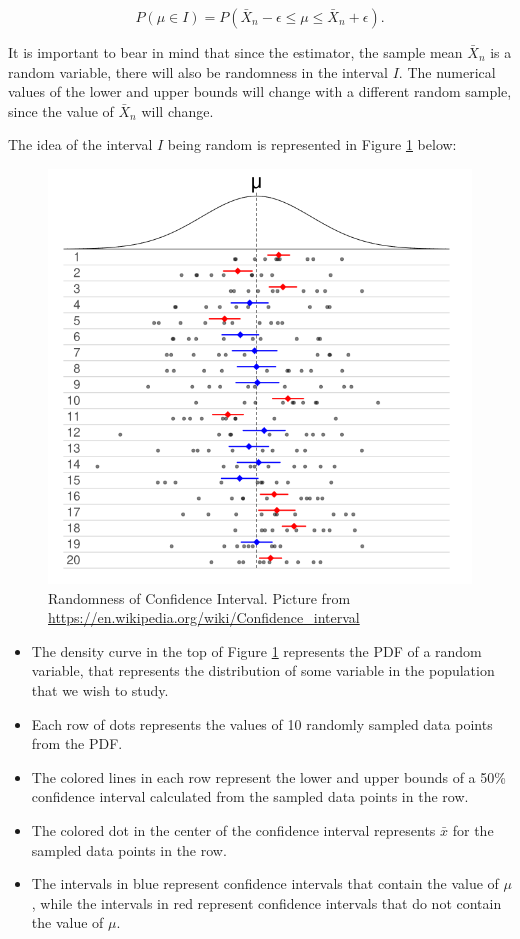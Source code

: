 \documentclass[
]{book}
\providecommand{\tightlist}{%
  \setlength{\itemsep}{0pt}\setlength{\parskip}{0pt}}
\begin{document}
\begin{equation} 
P(\mu \in  I) = P(\bar{X}_n - \epsilon \leq \mu \leq \bar{X}_n + \epsilon).
\label{eq:8-CIprob}
\end{equation}

It is important to bear in mind that since the estimator, the sample mean \(\bar{X}_n\) is a random variable, there will also be randomness in the interval \(I\). The numerical values of the lower and upper bounds will change with a different random sample, since the value of \(\bar{X}_n\) will change.

The idea of the interval \(I\) being random is represented in Figure \ref{fig:8-CI} below:

\begin{figure}
\centering
\includegraphics{images/08-CI.png}
\caption{\label{fig:8-CI}Randomness of Confidence Interval. Picture from \url{https://en.wikipedia.org/wiki/Confidence_interval}}
\end{figure}

\begin{itemize}
\tightlist
\item
  The density curve in the top of Figure \ref{fig:8-CI} represents the PDF of a random variable, that represents the distribution of some variable in the population that we wish to study.
\item
  Each row of dots represents the values of 10 randomly sampled data points from the PDF.
\item
  The colored lines in each row represent the lower and upper bounds of a 50\% confidence interval calculated from the sampled data points in the row.
\item
  The colored dot in the center of the confidence interval represents \(\bar{x}\) for the sampled data points in the row.
\item
  The intervals in blue represent confidence intervals that contain the value of \(\mu\), while the intervals in red represent confidence intervals that do not contain the value of \(\mu\).
\end{itemize}
\end{document}
